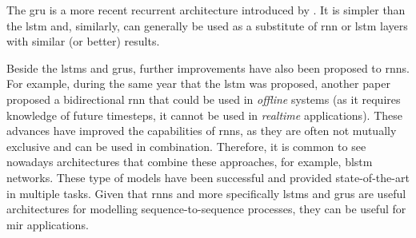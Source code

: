 

The \gls{gru} is a more recent recurrent architecture
introduced by \textcite{cho2014learning}. It is simpler than
the \gls{lstm} and, similarly, can generally be used as a
substitute of \gls{rnn} or \gls{lstm} layers with similar
(or better) results.

Beside the \glspl{lstm} and \glspl{gru}, further
improvements have also been proposed to \glspl{rnn}. For
example, during the same year that the \gls{lstm} was
proposed, another paper proposed a bidirectional \gls{rnn}
that could be used in \emph{offline} systems (as it requires
knowledge of future timesteps, it cannot be used in
\emph{realtime} applications). These advances have improved
the capabilities of \glspl{rnn}, as they are often not
mutually exclusive and can be used in combination.
Therefore, it is common to see nowadays architectures that
combine these approaches, for example, \gls{blstm} networks.
These type of models have been successful and provided
state-of-the-art in multiple tasks. Given that \glspl{rnn}
and more specifically \glspl{lstm} and \glspl{gru} are
useful architectures for modelling sequence-to-sequence
processes, they can be useful for \gls{mir} applications.

